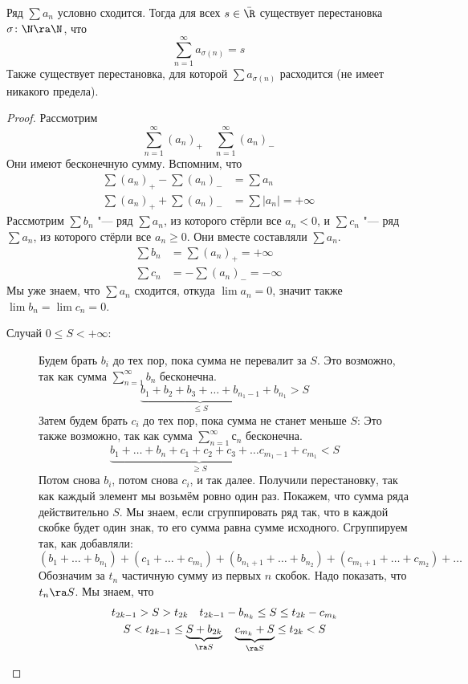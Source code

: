 \begin{theorem}[Римана]
	Ряд $\sum a_n$ условно сходится.
	Тогда для всех $s \in \bar \R$ существует перестановка $\sigma\colon \N \ra \N$, что
	\[ \sum_{n=1}^\infty a_{\sigma(n)} = s \]
	Также существует перестановка, для которой $\sum a_{\sigma(n)}$ расходится (не имеет никакого предела).
\end{theorem}
\begin{proof}
	Рассмотрим
	\[ \sum_{n=1}^\infty (a_n)_+ \quad \sum_{n=1}^\infty (a_n)_-\]
	Они имеют бесконечную сумму.
	Вспомним, что
	\begin{align*}
		\sum (a_n)_+ - \sum (a_n)_- &= \sum a_n \\
		\sum (a_n)_+ + \sum (a_n)_- &= \sum |a_n| = +\infty
	\end{align*}
	Рассмотрим $\sum b_n$ "--- ряд $\sum a_n$, из которого стёрли все $a_n < 0$,
	и $\sum c_n$ "--- ряд $\sum a_n$, из которого стёрли все $a_n \ge 0$.
	Они вместе составляли $\sum a_n$.
	\begin{align*}
		\sum b_n &= \sum (a_n)_+ = +\infty \\
		\sum c_n &= -\sum (a_n)_- = -\infty
	\end{align*}
	Мы уже знаем, что $\sum a_n$ сходится, откуда $\lim a_n = 0$, значит также $\lim b_n = \lim c_n = 0$.
	\begin{description}
	\item[Случай $0 \le S < +\infty$:]
		Будем брать $b_i$ до тех пор, пока сумма не перевалит за $S$.
		Это возможно, так как сумма $\sum_{n=1}^\infty b_n$ бесконечна.
		\[ \underbrace{b_1 + b_2 + b_3 + \dots + b_{n_1 - 1}}_{\le S} + b_{n_1} > S \]
		Затем будем брать $c_i$ до тех пор, пока сумма не станет меньше $S$:
		Это также возможно, так как сумма $\sum_{n=1}^\infty с_n$ бесконечна.
		\[ \underbrace{b_1 + \dots + b_n + c_1 + c_2 + c_3 + \dots c_{m_1 - 1}}_{\ge S} + c_{m_1} < S \]
		Потом снова $b_i$, потом снова $c_i$, и так далее.
		Получили перестановку, так как каждый элемент мы возьмём ровно один раз.
		Покажем, что сумма ряда действительно $S$.
		Мы знаем, если сгруппировать ряд так, что в каждой скобке будет один знак, то его сумма равна сумме исходного.
		Сгруппируем так, как добавляли:
		\[ (b_1 + \dots + b_{n_1}) + (c_1 + \dots + c_{m_1}) + (b_{n_1+1} + \dots + b_{n_2}) + (c_{m_1+1} + \dots + c_{m_2}) + \dots \]
		Обозначим за $t_n$ частичную сумму из первых $n$ скобок.
		Надо показать, что $t_n \ra S$.
		Мы знаем, что
		\begin{gather*}
			t_{2k - 1} > S > t_{2k} \quad t_{2k - 1} - b_{n_k} \le S \le t_{2k} - c_{m_k} \\
			S < t_{2k - 1} \le \underbrace{S + b_{2k}}_{\ra S} \quad \underbrace{c_{m_k} + S}_{\ra S} \le t_{2k} < S
		\end{gather*}


\end{description}
\end{proof}
